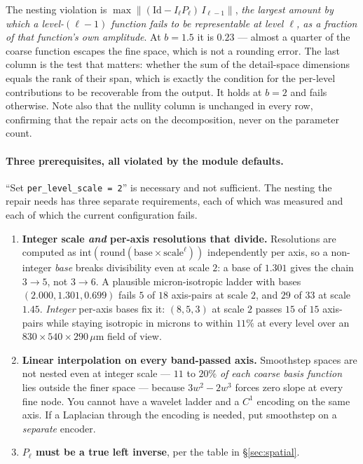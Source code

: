 \documentclass[11pt,a4paper]{article}
\newcommand{\Id}{\mathrm{Id}}
\begin{document}
\noindent
The nesting violation is
$\max\big\|(\Id - I_\ell P_\ell)\,I_{\ell-1}\big\|$, \emph{the largest amount by which a
level-$(\ell-1)$ function fails to be representable at level $\ell$, as a fraction of that
function's own amplitude}. At $b=1.5$ it is $0.23$ --- almost a quarter of the coarse
function escapes the fine space, which is not a rounding error. The last column is the test
that matters: whether the sum of the detail-space dimensions equals the rank of their span,
which is exactly the condition for the per-level contributions to be recoverable from the
output. It holds at $b=2$ and fails otherwise. Note also that the nullity column is
unchanged in every row, confirming that the repair acts on the decomposition, never on the
parameter count.

\paragraph{Three prerequisites, all violated by the module defaults.} ``Set
\texttt{per\_level\_scale = 2}'' is necessary and not sufficient. The nesting the repair
needs has three separate requirements, each of which was measured and each of which the
current configuration fails.

\begin{enumerate}[leftmargin=1.6em,itemsep=3pt]
\item \textbf{Integer scale \emph{and} per-axis resolutions that divide.} Resolutions are
computed as $\mathrm{int}(\mathrm{round}(\mathrm{base}\times\mathrm{scale}^\ell))$
independently per axis, so a non-integer \emph{base} breaks divisibility even at scale $2$:
a base of $1.301$ gives the chain $3\to5$, not $3\to6$. A plausible micron-isotropic ladder
with bases $(2.000, 1.301, 0.699)$ fails $5$ of $18$ axis-pairs at scale $2$, and $29$ of
$33$ at scale $1.45$. \emph{Integer} per-axis bases fix it: $(8,5,3)$ at scale $2$ passes
$15$ of $15$ axis-pairs while staying isotropic in microns to within $11\%$ at every level
over an $830\times540\times290\,\mu$m field of view.
\item \textbf{Linear interpolation on every band-passed axis.} Smoothstep spaces are not
nested even at integer scale --- $11$ to $20\%$ \emph{of each coarse basis function} lies
outside the finer space --- because $3w^2-2w^3$ forces zero slope at every fine node. You
cannot have a wavelet ladder and a $C^1$ encoding on the same axis. If a Laplacian through
the encoding is needed, put smoothstep on a \emph{separate} encoder.
\item \textbf{$P_\ell$ must be a true left inverse}, per the table in \S\ref{sec:spatial}.
\end{enumerate}
\end{document}
